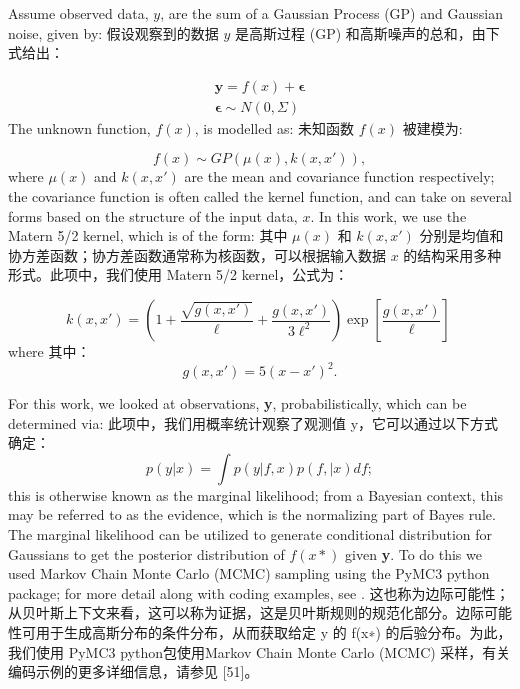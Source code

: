 \documentclass{ctexart}
\begin{document}
Assume observed data, $y$, are the sum of a Gaussian Process (GP) and Gaussian noise, given by:
假设观察到的数据 $y$ 是高斯过程 (GP) 和高斯噪声的总和，由下式给出：

\begin{eqnarray}
\mathbf{y} = f(x) + \mathbf{\epsilon}  \\
\mathbf{\epsilon}  \sim N(0,\Sigma) 
\end{eqnarray}
The unknown function, $f(x)$, is modelled as:
未知函数  $f(x)$ 被建模为:

\begin{equation}
f(x) \sim GP(\mu(x), k(x,x')),
\end{equation}
where $\mu(x)$ and $k(x,x')$ are the mean and covariance function respectively; the covariance function is often called the kernel function, and can take on several forms based on the structure of the input data, $x$. In this work, we use the Matern 5/2 kernel, which is of the form:
其中 $\mu(x)$ 和 $k(x,x')$ 分别是均值和协方差函数；协方差函数通常称为核函数，可以根据输入数据 $x$ 的结构采用多种形式。此项中，我们使用 Matern 5/2 kernel，公式为：

\begin{equation}
k(x,x') = \left( 1 + \dfrac{\sqrt{g(x,x')}}{\ell} + \dfrac{g(x,x')}{3\ell^2}\right)\exp\left[ \dfrac{g(x,x')}{\ell} \right]\ 
\end{equation}
where 其中：
\begin{equation}
	g(x,x') = 5(x-x')^2.
\end{equation}

For this work, we looked at observations, \textbf{y}, probabilistically, which can be determined via:
此项中，我们用概率统计观察了观测值 y，它可以通过以下方式确定：
\begin{equation}
p(y|x) = \int p(y | f,x) p (f, |x) df;
\end{equation}
this is otherwise known as the marginal likelihood; from a Bayesian context, this may be referred to as the evidence, which is the normalizing part of Bayes rule. The marginal likelihood can be utilized to generate conditional distribution for Gaussians to get the posterior distribution of $f(x*)$ given \textbf{y}. To do this we used Markov Chain Monte Carlo (MCMC) sampling using the PyMC3 python package; for more detail along with coding examples, see \cite{Fon20}. 这也称为边际可能性；从贝叶斯上下文来看，这可以称为证据，这是贝叶斯规则的规范化部分。边际可能性可用于生成高斯分布的条件分布，从而获取给定 y 的 f(x∗) 的后验分布。为此，我们使用 PyMC3 python包使用Markov Chain Monte Carlo (MCMC) 采样，有关编码示例的更多详细信息，请参见 [51]。
\end{document}
